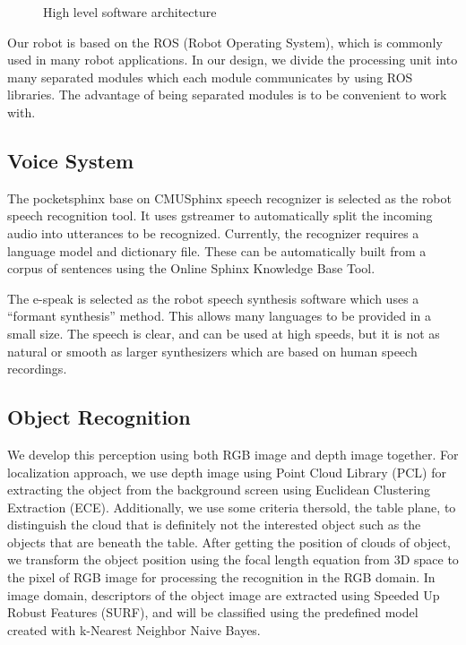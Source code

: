 \documentclass{llncs}
\newcommand{\dq}[1]{``#1''}
\begin{document}
\begin{figure}
\centering
\caption{High level software architecture}
\label{fig:soft_arc}
\end{figure}

Our robot is based on the ROS (Robot Operating System), which is commonly used in many robot applications. In our design, we divide the processing unit into many separated modules which each module communicates by using ROS libraries. The advantage of being separated modules is to be convenient to work with.

\subsection{Voice System}

The pocketsphinx base on CMUSphinx speech recognizer is selected as the robot speech recognition tool. It uses gstreamer to automatically split the incoming audio into utterances to be recognized. Currently, the recognizer requires a language model and dictionary file. These can be automatically built from a corpus of sentences using the Online Sphinx Knowledge Base Tool.

The e-speak is selected as the robot speech synthesis software which uses a \dq{formant synthesis} method. This allows many languages to be provided in a small size. The speech is clear, and can be used at high speeds, but it is not as natural or smooth as larger synthesizers which are based on human speech recordings.

\subsection{Object Recognition}

We develop this perception using both RGB image and depth image together. For localization approach, we use depth image using Point Cloud Library (PCL) for extracting the object from the background screen using Euclidean Clustering Extraction (ECE). Additionally, we use some criteria thersold, the table plane, to distinguish the cloud that is definitely not the interested object such as the objects that are beneath the table. After getting the position of clouds of object, we transform the object position using the focal length equation from 3D space to the pixel of RGB image for processing the recognition in the RGB domain. In image domain, descriptors of the object image are extracted using Speeded Up Robust Features (SURF), and will be classified using the predefined model created with k-Nearest Neighbor Naive Bayes.
\end{document}
